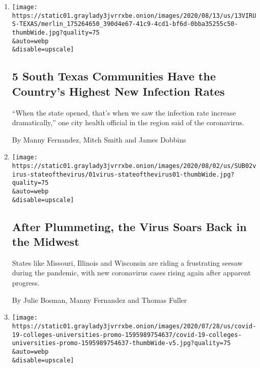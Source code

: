 \begin{enumerate}
\def\labelenumi{\arabic{enumi}.}
\item
  \href{/2020/08/13/us/coronavirus-south-texas.html}{}

  \texttt{[image: https://static01.graylady3jvrrxbe.onion/images/2020/08/13/us/13VIRUS-TEXAS/merlin\_175264650\_390d4e67-41c9-4cd1-bf6d-0bba35255c50-thumbWide.jpg?quality=75\\\&auto=webp\\\&disable=upscale]}

  \hypertarget{5-south-texas-communities-have-the-countrys-highest-new-infection-rates}{%
  \subsection{5 South Texas Communities Have the Country's Highest New
  Infection
  Rates}\label{5-south-texas-communities-have-the-countrys-highest-new-infection-rates}}

  ``When the state opened, that's when we saw the infection rate
  increase dramatically,'' one city health official in the region said
  of the coronavirus.

  By Manny Fernandez, Mitch Smith and James Dobbins
\item
  \href{/2020/08/01/us/coronavirus-midwest-cases-deaths.html}{}

  \texttt{[image: https://static01.graylady3jvrrxbe.onion/images/2020/08/02/us/SUB02virus-stateofthevirus/01virus-stateofthevirus01-thumbWide.jpg?quality=75\\\&auto=webp\\\&disable=upscale]}

  \hypertarget{after-plummeting-the-virus-soars-back-in-the-midwest}{%
  \subsection{After Plummeting, the Virus Soars Back in the
  Midwest}\label{after-plummeting-the-virus-soars-back-in-the-midwest}}

  States like Missouri, Illinois and Wisconsin are riding a frustrating
  seesaw during the pandemic, with new coronavirus cases rising again
  after apparent progress.

  By Julie Bosman, Manny Fernandez and Thomas Fuller
\item
  \href{/interactive/2020/07/28/us/covid-19-colleges-universities.html}{}

  \texttt{[image: https://static01.graylady3jvrrxbe.onion/images/2020/07/28/us/covid-19-colleges-universities-promo-1595989754637/covid-19-colleges-universities-promo-1595989754637-thumbWide-v5.jpg?quality=75\\\&auto=webp\\\&disable=upscale]}


\end{enumerate}

